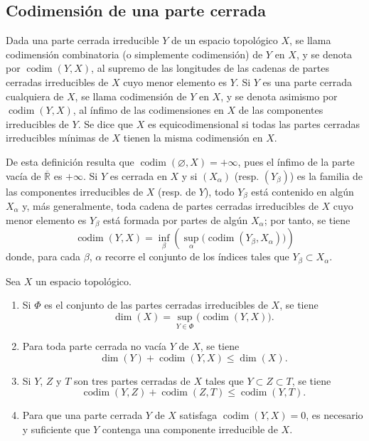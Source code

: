 \subsection{Codimensión de una parte cerrada}
\label{subsection:0.14.2-fr}

\begin{definition}[14.2.1]
\label{0.14.2.1-fr}
Dada una parte cerrada irreducible $Y$ de un espacio topológico $X$, se llama
codimensión combinatoria \textup{(o simplemente} codimensión) de $Y$ en
$X$, y se denota por $\operatorname{codim}(Y,X)$, al supremo de las longitudes
de las cadenas de partes cerradas irreducibles de $X$ cuyo menor elemento es
$Y$. Si $Y$ es una parte cerrada cualquiera de $X$, se llama
codimensión de $Y$ en $X$, y se denota asimismo por
$\operatorname{codim}(Y,X)$, al ínfimo de las codimensiones en $X$ de las
componentes irreducibles de $Y$. Se dice que $X$ es
equicodimensional si todas las partes cerradas irreducibles mínimas de
$X$ tienen la misma codimensión en $X$.
\end{definition}

De esta definición resulta que
$\operatorname{codim}(\varnothing,X)=+\infty$, pues el ínfimo de la parte vacía
de $\overline{\mathbb R}$ es $+\infty$. Si $Y$ es cerrada en $X$ y si
$(X_\alpha)$ (resp. $(Y_\beta)$) es la familia de las componentes irreducibles
de $X$ (resp. de $Y$), todo $Y_\beta$ está contenido en algún $X_\alpha$ y,
más generalmente, toda cadena de partes cerradas irreducibles de $X$ cuyo menor
elemento es $Y_\beta$ está formada por partes de algún $X_\alpha$; por tanto,
se tiene
\[
  \operatorname{codim}(Y,X)=
  \inf_\beta\left(\sup_\alpha
  \bigl(\operatorname{codim}(Y_\beta,X_\alpha)\bigr)\right)
  \tag{14.2.1.1}\label{0.14.2.1.1-fr}
\]
donde, para cada $\beta$, $\alpha$ recorre el conjunto de los índices tales que
$Y_\beta\subset X_\alpha$.

\begin{proposition}[14.2.2]
\label{0.14.2.2-fr}
Sea $X$ un espacio topológico.
\begin{enumerate}
  \item[\rm(i)] Si $\Phi$ es el conjunto de las partes cerradas irreducibles de
  $X$, se tiene
  \[
    \dim(X)=\sup_{Y\in\Phi}\bigl(\operatorname{codim}(Y,X)\bigr).
    \tag{14.2.2.1}\label{0.14.2.2.1-fr}
  \]
  \item[\rm(ii)] Para toda parte cerrada no vacía $Y$ de $X$, se tiene
  \[
    \dim(Y)+\operatorname{codim}(Y,X)\leq\dim(X).
    \tag{14.2.2.2}\label{0.14.2.2.2-fr}
  \]
  \item[\rm(iii)] Si $Y$, $Z$ y $T$ son tres partes cerradas de $X$ tales que
  $Y\subset Z\subset T$, se tiene
  \[
    \operatorname{codim}(Y,Z)+\operatorname{codim}(Z,T)
    \leq\operatorname{codim}(Y,T).
    \tag{14.2.2.3}\label{0.14.2.2.3-fr}
  \]
  \item[\rm(iv)] Para que una parte cerrada $Y$ de $X$ satisfaga
  $\operatorname{codim}(Y,X)=0$, es necesario y suficiente que $Y$ contenga
  una componente irreducible de $X$.
\end{enumerate}
\end{proposition}


